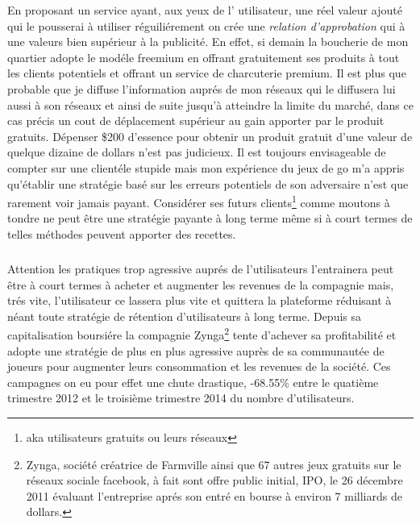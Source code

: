\documentclass[11pt, a4paper ]{article}
\begin{document}
\begin{spacing}{1.5}
En proposant un service ayant, aux yeux de l' utilisateur, une réel valeur ajouté qui le pousserai à utiliser réguiliérement on crée une \emph{relation d'approbation} qui à une valeurs bien supérieur à la publicité.
En effet, si demain la boucherie de mon quartier adopte le modéle freemium en offrant gratuitement ses produits à tout les clients potentiels et offrant un service de charcuterie premium.
Il est plus que probable que je diffuse l'information auprés de mon réseaux qui le diffusera lui aussi à son réseaux et ainsi de suite jusqu'à atteindre la limite du marché, dans ce cas précis un cout de déplacement supérieur au gain apporter par le produit gratuits.
Dépenser \$200 d'essence pour obtenir un produit gratuit d'une valeur de quelque dizaine de dollars n'est pas judicieux. Il est toujours envisageable de compter sur une clientéle stupide mais mon expérience du jeux de go m'a appris qu'établir une stratégie basé sur les erreurs potentiels de son adversaire n'est que rarement voir jamais payant.
Considérer ses futurs clients\footnote{aka utilisateurs gratuits ou leurs réseaux} comme moutons à tondre ne peut être une stratégie payante à long terme même si à court termes de telles méthodes peuvent apporter des recettes.
\subparagraph{}
Attention les pratiques trop agressive auprés de l'utilisateurs l'entrainera peut être à court termes à acheter et augmenter les revenues de la compagnie mais, trés vite, l'utilisateur ce lassera plus vite et quittera la plateforme réduisant à néant toute stratégie de rétention d'utilisateurs à long terme. Depuis sa capitalisation boursiére la compagnie Zynga\footnote{Zynga, société créatrice de Farmville ainsi que 67 autres jeux gratuits sur le réseaux sociale facebook, à fait sont offre public initial, IPO, le 26 décembre 2011 évaluant l'entreprise aprés son entré en bourse à environ 7 milliards de dollars.\cite{ipoZynga}} tente d'achever sa profitabilité et adopte une stratégie de plus en plus agressive auprès de sa communautée de joueurs pour augmenter leurs consommation et les revenues de la société. Ces campagnes on eu pour effet une chute drastique, -68.55\% entre le quatième trimestre 2012 et le troisième trimestre 2014 du nombre d'utilisateurs.


\end{spacing}
\end{document}
